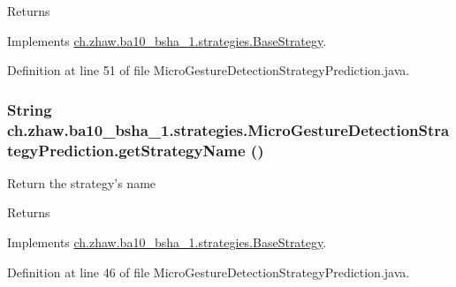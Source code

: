 \begin{DoxyReturn}{Returns}

\end{DoxyReturn}


Implements \hyperlink{classch_1_1zhaw_1_1ba10__bsha__1_1_1strategies_1_1BaseStrategy_a75fdb36932ad701f6375cc1fe718056b}{ch.zhaw.ba10\_\-bsha\_\-1.strategies.BaseStrategy}.

Definition at line 51 of file MicroGestureDetectionStrategyPrediction.java.\hypertarget{classch_1_1zhaw_1_1ba10__bsha__1_1_1strategies_1_1MicroGestureDetectionStrategyPrediction_a68da2773da59d52a57a8c57b4695fe14}{
\subsubsection[{getStrategyName}]{\setlength{\rightskip}{0pt plus 5cm}String ch.zhaw.ba10\_\-bsha\_\-1.strategies.MicroGestureDetectionStrategyPrediction.getStrategyName ()}}
\label{classch_1_1zhaw_1_1ba10__bsha__1_1_1strategies_1_1MicroGestureDetectionStrategyPrediction_a68da2773da59d52a57a8c57b4695fe14}
Return the strategy's name

\begin{DoxyReturn}{Returns}

\end{DoxyReturn}


Implements \hyperlink{classch_1_1zhaw_1_1ba10__bsha__1_1_1strategies_1_1BaseStrategy_aa0ebed55eed45409bad13d43a0058780}{ch.zhaw.ba10\_\-bsha\_\-1.strategies.BaseStrategy}.

Definition at line 46 of file MicroGestureDetectionStrategyPrediction.java.

